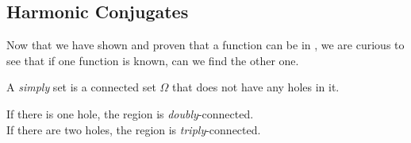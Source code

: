 \subsection{Harmonic Conjugates}\label{subsec:Harmonic_Conjugates}
Now that we have shown and proven that a function can be  in , we are curious to see that if one function is known, can we find the other one.

\begin{definition}[Simply]\label{def:Simply}
  A \emph{simply}  set is a connected set $\Omega$ that does not have any holes in it.

  \begin{remark}\label{rmk:Multiply_Connected}
    If there is one hole, the region is \emph{doubly}-connected. \\
    If there are two holes, the region is \emph{triply}-connected.
  \end{remark}
\end{definition}


